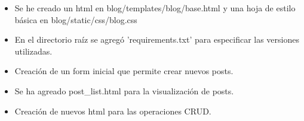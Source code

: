 \documentclass{article}
\begin{document}
        \begin{itemize}	
		\item Se he creado un html en blog/templates/blog/base.html y una hoja de estilo básica en blog/static/css/blog.css
	\end{itemize}
        
        
        \begin{itemize}	
		\item En el directorio raíz se agregó 'requirements.txt' para especificar las versiones utilizadas.
	\end{itemize}
        
        \begin{itemize}	
		\item Creación de un form inicial que permite crear nuevos posts.
	\end{itemize}
        
        \begin{itemize}	
		\item Se ha agreado post\_list.html para la visualización de posts.
	\end{itemize}
        

        \begin{itemize}	
		\item Creación de nuevos html para las operaciones CRUD.
	\end{itemize}
        
        
        
\end{document}
